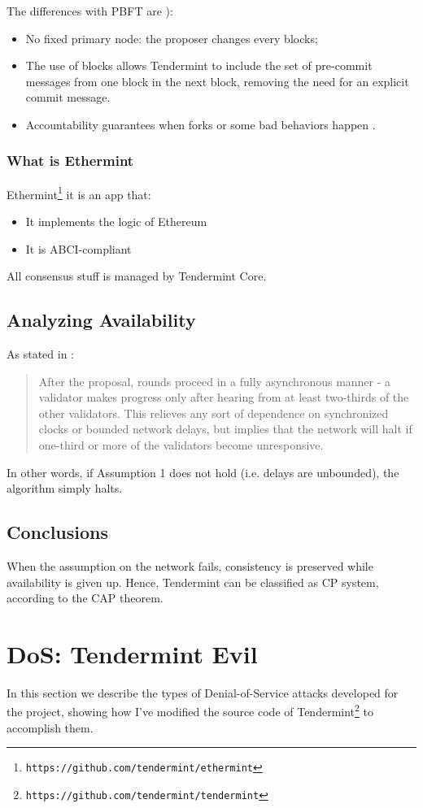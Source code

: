 \documentclass[]{article}
\begin{document}
The differences with PBFT are \cite[Section 10.2.4]{tthesis}):
\begin{itemize}
\item No fixed primary node: the proposer changes every blocks;
\item The use of blocks allows Tendermint to include the set of pre-commit messages from one block in the next block, removing the need for an explicit commit message.
\item Accountability guarantees when forks or some bad behaviors happen \cite[Section 3.5]{tthesis}.
\end{itemize}

\subsubsection{What is Ethermint}
Ethermint\footnote{\texttt{https://github.com/tendermint/ethermint}} it is an app that:
\begin{itemize}
\item It implements the logic of Ethereum
\item It is ABCI-compliant
\end{itemize}
All consensus stuff is managed by Tendermint Core.

\subsection{Analyzing Availability}
As stated in \cite[Section 3.2: Consensus]{tthesis}:
\blockquote{
	After the proposal, rounds proceed in a fully asynchronous manner - a validator makes progress only after hearing from at least two-thirds of the other validators. This relieves any sort of dependence on synchronized clocks or bounded network delays, but implies that the network will halt if one-third or more of the validators become unresponsive.}

In other words, if Assumption 1 does not hold (i.e. delays are unbounded), the algorithm simply halts.
\subsection{Conclusions}
When the assumption on the network fails, consistency is preserved while availability is given up. Hence, Tendermint can be classified as CP system, according to the CAP theorem.

\section{DoS: Tendermint Evil}
\label{tevil}
In this section we describe the types of Denial-of-Service attacks developed for the project, showing how I've modified the source code of Tendermint\footnote{\texttt{https://github.com/tendermint/tendermint}} to accomplish them.
\end{document}
